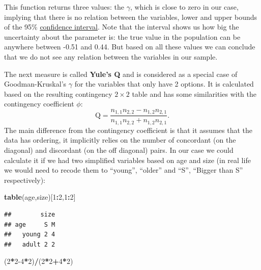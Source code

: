 \documentclass[
]{book}
\newenvironment{Shaded}{\begin{snugshade}}{\end{snugshade}}
\newcommand{\DecValTok}[1]{\textcolor[rgb]{0.00,0.00,0.81}{#1}}
\newcommand{\FunctionTok}[1]{\textcolor[rgb]{0.13,0.29,0.53}{\textbf{#1}}}
\newcommand{\NormalTok}[1]{#1}
\newcommand{\SpecialCharTok}[1]{\textcolor[rgb]{0.81,0.36,0.00}{\textbf{#1}}}
\theoremstyle{definition}
\theoremstyle{definition}
\theoremstyle{definition}
\theoremstyle{definition}
\theoremstyle{remark}
\begin{document}
This function returns three values: the \(\gamma\), which is close to zero in our case, implying that there is no relation between the variables, lower and upper bounds of the 95\% \hyperref[confidenceIntervals]{confidence interval}. Note that the interval shows us how big the uncertainty about the parameter is: the true value in the population can be anywhere between -0.51 and 0.44. But based on all these values we can conclude that we do not see any relation between the variables in our sample.

The next measure is called \textbf{Yule's Q} and is considered as a special case of Goodman-Kruskal's \(\gamma\) for the variables that only have 2 options. It is calculated based on the resulting contingency \(2\times 2\) table and has some similarities with the contingency coefficient \(\phi\):
\begin{equation}
    \mathrm{Q} = \frac{n_{1,1} n_{2,2} - n_{1,2} n_{2,1}}{n_{1,1} n_{2,2} + n_{1,2} n_{2,1}} .
    \label{eq:measuresAssociationYule}
\end{equation}
The main difference from the contingency coefficient is that it assumes that the data has ordering, it implicitly relies on the number of concordant (on the diagonal) and discordant (on the off diagonal) pairs. In our case we could calculate it if we had two simplified variables based on age and size (in real life we would need to recode them to ``young'', ``older'' and ``S'', ``Bigger than S'' respectively):

\begin{Shaded}
\begin{Highlighting}[]
\FunctionTok{table}\NormalTok{(age,size)[}\DecValTok{1}\SpecialCharTok{:}\DecValTok{2}\NormalTok{,}\DecValTok{1}\SpecialCharTok{:}\DecValTok{2}\NormalTok{]}
\end{Highlighting}
\end{Shaded}

\begin{verbatim}
##        size
## age     S M
##   young 2 4
##   adult 2 2
\end{verbatim}

\begin{Shaded}
\begin{Highlighting}[]
\NormalTok{(}\DecValTok{2}\SpecialCharTok{*}\DecValTok{2{-}4}\SpecialCharTok{*}\DecValTok{2}\NormalTok{)}\SpecialCharTok{/}\NormalTok{(}\DecValTok{2}\SpecialCharTok{*}\DecValTok{2}\SpecialCharTok{+}\DecValTok{4}\SpecialCharTok{*}\DecValTok{2}\NormalTok{)}
\end{Highlighting}
\end{Shaded}
\end{document}
